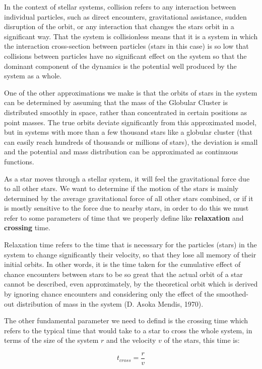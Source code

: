 In the context of stellar systems, collision refers to any interaction between individual particles, such as direct encounters, gravitational assistance, sudden disruption of the orbit, or any interaction that changes the stars orbit in a significant way. That the system is collisionless means that it is a system in which the interaction cross-section between particles (stars in this case) is so low that collisions between particles have no significant effect on the system so that the dominant component of the dynamics is the potential well produced by the system as a whole.  

One of the other approximations we make is that the orbits of stars in the system can be determined by assuming that the mass of the Globular Cluster is distributed smoothly in space, rather than concentrated in certain positions as point masses. The true orbits deviate significantly from this approximated model, but in systems with more than a few thousand stars like a globular cluster (that can easily reach hundreds of thousands or millions of stars), the deviation is small and the potential and mass distribution can be approximated as continuous functions. 

As a star moves through a stellar system, it will feel the gravitational force due to all other stars. We want to determine if the motion of the stars is mainly determined by the average gravitational force of all other stars combined, or if it is mostly sensitive to the force due to nearby stars, in order to do this we must refer to some parameters of time that we properly define like \textbf{relaxation} and \textbf{crossing} time. 

Relaxation time refers to the time that is necessary for the particles (stars) in the system to change significantly their velocity, so that they lose all memory of their initial orbits. In other words, it is the time taken for the cumulative effect of chance encounters between stars to be so great that the actual orbit of a star cannot be described, even approximately, by the theoretical orbit which is derived by ignoring chance encounters and considering only the effect of the smoothed-out distribution of mass in the system (D. Asoka Mendis, 1970). 

The other fundamental parameter we need to defind is the crossing time which refers to the typical time that would take to a star to cross the whole system, in terms of the size of the system $r$ and the velocity $v$ of the stars, this time is:

\begin{equation}
t_{cross}=\frac{r}{v}
\end{equation}

